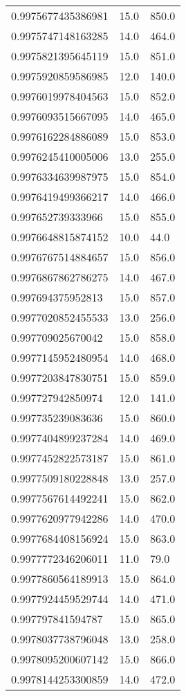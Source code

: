 \begin{center}
\begin{supertabular}[H]{p{0.30\textwidth}p{0.05\textwidth}p{0.05\textwidth}}
0.9975677435386981 & 15.0 & 850.0 \\ 
0.9975747148163285 & 14.0 & 464.0 \\ 
0.9975821395645119 & 15.0 & 851.0 \\ 
0.9975920859586985 & 12.0 & 140.0 \\ 
0.9976019978404563 & 15.0 & 852.0 \\ 
0.9976093515667095 & 14.0 & 465.0 \\ 
0.9976162284886089 & 15.0 & 853.0 \\ 
0.9976245410005006 & 13.0 & 255.0 \\ 
0.9976334639987975 & 15.0 & 854.0 \\ 
0.9976419499366217 & 14.0 & 466.0 \\ 
0.997652739333966 & 15.0 & 855.0 \\ 
0.9976648815874152 & 10.0 & 44.0 \\ 
0.9976767514884657 & 15.0 & 856.0 \\ 
0.9976867862786275 & 14.0 & 467.0 \\ 
0.997694375952813 & 15.0 & 857.0 \\ 
0.9977020852455533 & 13.0 & 256.0 \\ 
0.997709025670042 & 15.0 & 858.0 \\ 
0.9977145952480954 & 14.0 & 468.0 \\ 
0.9977203847830751 & 15.0 & 859.0 \\ 
0.997727942850974 & 12.0 & 141.0 \\ 
0.997735239083636 & 15.0 & 860.0 \\ 
0.9977404899237284 & 14.0 & 469.0 \\ 
0.9977452822573187 & 15.0 & 861.0 \\ 
0.9977509180228848 & 13.0 & 257.0 \\ 
0.9977567614492241 & 15.0 & 862.0 \\ 
0.9977620977942286 & 14.0 & 470.0 \\ 
0.9977684408156924 & 15.0 & 863.0 \\ 
0.9977772346206011 & 11.0 & 79.0 \\ 
0.9977860564189913 & 15.0 & 864.0 \\ 
0.9977924459529744 & 14.0 & 471.0 \\ 
0.997797841594787 & 15.0 & 865.0 \\ 
0.9978037738796048 & 13.0 & 258.0 \\ 
0.9978095200607142 & 15.0 & 866.0 \\ 
0.9978144253300859 & 14.0 & 472.0 \\ 

\end{supertabular}
\end{center}
